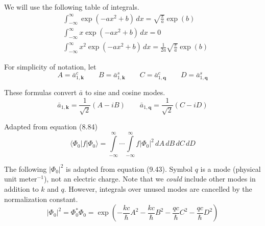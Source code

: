 


We will use the following table of integrals.
\begin{align*}
&\int_{-\infty}^\infty\exp(-ax^2+b)\,dx=\sqrt{\frac{\pi}{a}}\exp(b)
\tag{1}
\\
&\int_{-\infty}^\infty x\exp(-ax^2+b)\,dx=0
\tag{2}
\\
&\int_{-\infty}^\infty x^2\exp(-ax^2+b)\,dx=\frac{1}{2a}\sqrt{\frac{\pi}{a}}\exp(b)
\tag{3}
\end{align*}

For simplicity of notation, let
\begin{equation*}
A=\bar a_{1,\mathbf k}^c
\qquad
B=\bar a_{1,\mathbf k}^s
\qquad
C=\bar a_{1,\mathbf q}^c
\qquad
D=\bar a_{1,\mathbf q}^s
\end{equation*}

These formulas convert $\bar a$ to sine and cosine modes.
\begin{equation*}
\bar a_{1,\mathbf k}=\frac{1}{\sqrt2}(A-iB)
\qquad
\bar a_{1,\mathbf q}=\frac{1}{\sqrt2}(C-iD)
\tag{4}
\end{equation*}

Adapted from equation (8.84)
\begin{equation*}
\langle\Phi_0|f|\Phi_0\rangle
=\int\limits_{-\infty}^\infty\cdots\int\limits_{-\infty}^\infty
f\vert\Phi_0\vert^2
\,dA\,dB\,dC\,dD
\end{equation*}

The following $\vert\Phi_0\vert^2$ is adapted from equation (9.43).
Symbol $q$ is a mode (physical unit $\text{meter}^{-1}$), not an electric charge.
Note that we {\it could} include other modes in addition to $k$ and $q$.
However, integrals over unused modes are
cancelled by the normalization constant.
\begin{equation*}
\vert\Phi_0\vert^2=\Phi_0^*\Phi_0=\exp\left(
-\frac{kc}{\hbar}A^2
-\frac{kc}{\hbar}B^2
-\frac{qc}{\hbar}C^2
-\frac{qc}{\hbar}D^2
\right)
\end{equation*}

